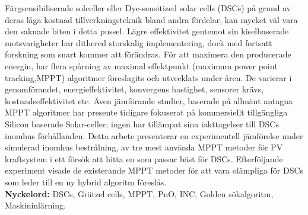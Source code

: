 Färgsensibiliserade solceller eller Dye-sensitized solar cells (DSCs) på grund av deras låga kostnad tillverkningsteknik bland andra fördelar, kan mycket väl vara den saknade biten i detta pussel. Lägre effektivitet gentemot sin kiselbaserade motsvarigheter har dithered storskalig implementering, dock med fortsatt forskning som snart kommer att förändras. För att maximera den producerade energin, har flera spårning av maximal effektpunkt (maximum power point tracking,MPPT) algoritmer föreslagits och utvecklats under åren. De varierar i genomförandet, energieffektivitet, konvergens hastighet, sensorer krävs, kostnadseffektivitet etc. Även jämförande studier, baserade på allmänt antagna MPPT algoritmer har presente tidigare fokuserat på kommersiellt tillgängliga Silicon baserade Solar-celler; ingen har tillämpat sina iakttagelser till DSCs inomhus förhållanden. Detta arbete presenterar en experimentell jämförelse under simulerad inomhus bestrålning, av tre mest använda MPPT metoder för PV kraftsystem i ett försök att hitta en som passar bäst för DSCs. Efterföljande experiment visade de existerande MPPT metoder för att vara olämpliga för DSCs som leder till en ny hybrid algoritm föreslås.\\

{\bf Nyckelord:} DSCs, Grätzel cells, MPPT, PnO, INC, Golden sökalgoritm, Maskininlärning. 
\acresetall
